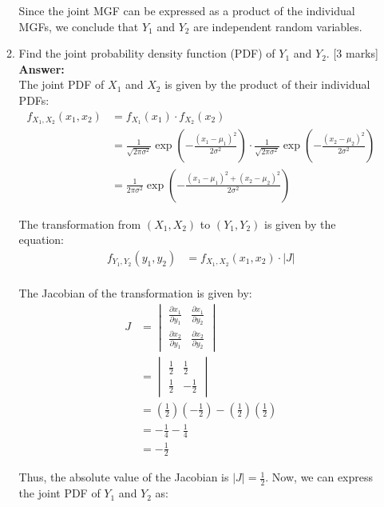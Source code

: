 \documentclass[12pt]{article}
\begin{document}
\begin{enumerate}
\begin{enumerate}
Since the joint MGF can be expressed as a product of the individual MGFs, we conclude that $Y_1$ and $Y_2$ are independent random variables.


\item Find the joint probability density function (PDF) of $Y_1$ and $Y_2$. 
			\hfill [3 marks]
%
\\
\textbf{Answer:}
\\

The joint PDF of $X_1$ and $X_2$ is given by the product of their individual PDFs:
\begin{align*}
f_{X_1, X_2}(x_1, x_2) &= f_{X_1}(x_1) \cdot f_{X_2}(x_2) \\
&= \frac{1}{\sqrt{2\pi \sigma^2}} \exp\left(-\frac{(x_1 - \mu_1)^2}{2\sigma^2}\right) \cdot \frac{1}{\sqrt{2\pi \sigma^2}} \exp\left(-\frac{(x_2 - \mu_2)^2}{2\sigma^2}\right) \\
&= \frac{1}{2\pi \sigma^2} \exp\left(-\frac{(x_1 - \mu_1)^2 + (x_2 - \mu_2)^2}{2\sigma^2}\right)
\end{align*}

The transformation from $(X_1, X_2)$ to $(Y_1, Y_2)$ is given by the equation:
\begin{align*}
f_{Y_1, Y_2}(y_1, y_2) &= f_{X_1, X_2}\left(x_1,x_2\right) \cdot \left|J\right| \\
\end{align*}

The Jacobian of the transformation is given by:
\begin{align*}
J &= \begin{vmatrix}
\frac{\partial x_1}{\partial y_1} & \frac{\partial x_1}{\partial y_2} \\
\frac{\partial x_2}{\partial y_1} & \frac{\partial x_2}{\partial y_2}
\end{vmatrix} \\
&= \begin{vmatrix}
\frac{1}{2} & \frac{1}{2} \\
\frac{1}{2} & -\frac{1}{2}
\end{vmatrix} \\
&= \left(\frac{1}{2}\right)\left(-\frac{1}{2}\right) - \left(\frac{1}{2}\right)\left(\frac{1}{2}\right) \\
&= -\frac{1}{4} - \frac{1}{4} \\
&= -\frac{1}{2}
\end{align*}

Thus, the absolute value of the Jacobian is $|J| = \frac{1}{2}$.
Now, we can express the joint PDF of $Y_1$ and $Y_2$ as:


\end{enumerate}
\end{enumerate}
\end{document}
